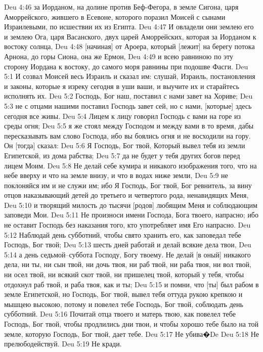 Deu 4:46  за Иорданом, на долине против Беф-Фегора, в земле Сигона, царя Аморрейского, жившего в Есевоне, которого поразил Моисей с сынами Израилевыми, по исшествии их из Египта.
Deu 4:47  И овладели они землею его и землею Ога, царя Васанского, двух царей Аморрейских, которая за Иорданом к востоку солнца,
Deu 4:48  [начиная] от Ароера, который [лежит] на берегу потока Арнона, до горы Сиона, она же Ермон,
Deu 4:49  и всею равниною по эту сторону Иордана к востоку, до самого моря равнины при подошве Фасги.
Deu 5:1  И созвал Моисей весь Израиль и сказал им: слушай, Израиль, постановления и законы, которые я изреку сегодня в уши ваши, и выучите их и старайтесь исполнять их.
Deu 5:2  Господь, Бог наш, поставил с нами завет на Хориве;
Deu 5:3  не с отцами нашими поставил Господь завет сей, но с нами, [которые] здесь сегодня все живы.
Deu 5:4  Лицем к лицу говорил Господь с вами на горе из среды огня;
Deu 5:5  я же стоял между Господом и между вами в то время, дабы пересказывать вам слово Господа, ибо вы боялись огня и не восходили на гору. Он [тогда] сказал:
Deu 5:6  Я Господь, Бог твой, Который вывел тебя из земли Египетской, из дома рабства;
Deu 5:7  да не будет у тебя других богов перед лицем Моим.
Deu 5:8  Не делай себе кумира и никакого изображения того, что на небе вверху и что на земле внизу, и что в водах ниже земли,
Deu 5:9  не поклоняйся им и не служи им; ибо Я Господь, Бог твой, Бог ревнитель, за вину отцов наказывающий детей до третьего и четвертого рода, ненавидящих Меня,
Deu 5:10  и творящий милость до тысячи [родов] любящим Меня и соблюдающим заповеди Мои.
Deu 5:11  Не произноси имени Господа, Бога твоего, напрасно; ибо не оставит Господь без наказания того, кто употребляет имя Его напрасно.
Deu 5:12  Наблюдай день субботний, чтобы свято хранить его, как заповедал тебе Господь, Бог твой;
Deu 5:13  шесть дней работай и делай всякие дела твои,
Deu 5:14  а день седьмой--суббота Господу, Богу твоему. Не делай [в оный] никакого дела, ни ты, ни сын твой, ни дочь твоя, ни раб твой, ни раба твоя, ни вол твой, ни осел твой, ни всякий скот твой, ни пришелец твой, который у тебя, чтобы отдохнул раб твой, и раба твоя, как и ты;
Deu 5:15  и помни, что [ты] был рабом в земле Египетской, но Господь, Бог твой, вывел тебя оттуда рукою крепкою и мышцею высокою, потому и повелел тебе Господь, Бог твой, соблюдать день субботний.
Deu 5:16  Почитай отца твоего и матерь твою, как повелел тебе Господь, Бог твой, чтобы продлились дни твои, и чтобы хорошо тебе было на той земле, которую Господь, Бог твой, дает тебе.
Deu 5:17  Не убива�De
Deu 5:18  Не прелюбодействуй.
Deu 5:19  Не кради.
